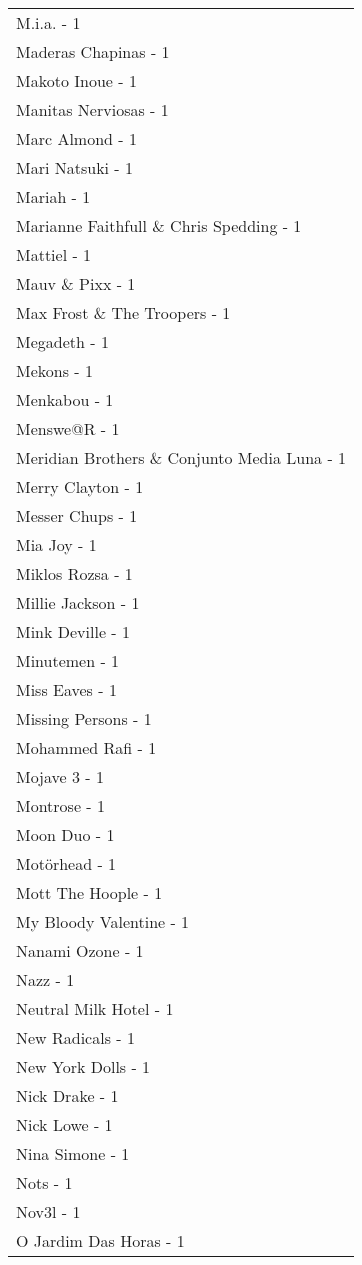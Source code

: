 \documentclass[
]{article}
\begin{document}
\begin{longtable}{l}
M.i.a. - 1 \\ 
Maderas Chapinas - 1 \\ 
Makoto Inoue - 1 \\ 
Manitas Nerviosas - 1 \\ 
Marc Almond - 1 \\ 
Mari Natsuki - 1 \\ 
Mariah - 1 \\ 
Marianne Faithfull \& Chris Spedding - 1 \\ 
Mattiel - 1 \\ 
Mauv \& Pixx - 1 \\ 
Max Frost \& The Troopers - 1 \\ 
Megadeth - 1 \\ 
Mekons - 1 \\ 
Menkabou - 1 \\ 
Menswe@R - 1 \\ 
Meridian Brothers \& Conjunto Media Luna - 1 \\ 
Merry Clayton - 1 \\ 
Messer Chups - 1 \\ 
Mia Joy - 1 \\ 
Miklos Rozsa - 1 \\ 
Millie Jackson - 1 \\ 
Mink Deville - 1 \\ 
Minutemen - 1 \\ 
Miss Eaves - 1 \\ 
Missing Persons - 1 \\ 
Mohammed Rafi - 1 \\ 
Mojave 3 - 1 \\ 
Montrose - 1 \\ 
Moon Duo - 1 \\ 
Motörhead - 1 \\ 
Mott The Hoople - 1 \\ 
My Bloody Valentine - 1 \\ 
Nanami Ozone - 1 \\ 
Nazz - 1 \\ 
Neutral Milk Hotel - 1 \\ 
New Radicals - 1 \\ 
New York Dolls - 1 \\ 
Nick Drake - 1 \\ 
Nick Lowe - 1 \\ 
Nina Simone - 1 \\ 
Nots - 1 \\ 
Nov3l - 1 \\ 
O Jardim Das Horas - 1 \\ 

\end{longtable}
\end{document}
